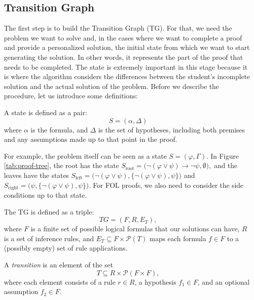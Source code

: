 \documentclass[runningheads]{llncs}
\begin{document}
\subsection{Transition Graph}
The first step is to build the Transition Graph (TG). For that, we need the problem we want to solve and, in the cases where we want to complete a proof and provide a personalized solution, the initial state from which we want to start generating the solution. In other words, it represents the part of the proof that needs to be completed. The state is extremely important in this stage because it is where the algorithm considers the differences between the student's incomplete solution and the actual solution of the problem. Before we describe the procedure, let us introduce some definitions:

\begin{definition}[State]
A state is defined as a pair:
\[
S = (\alpha, \Delta)
\]
where \(\alpha\) is the formula, and \(\Delta\) is the set of hypotheses, including both premises and any assumptions made up to that point in the proof.
\end{definition}

For example, the problem itself can be seen as a state \(S = (\varphi, \Gamma)\). In Figure \ref{tab:proof-tree}, the root has the state \(S_{\text{root}} = \big(\neg (\varphi \lor \psi) \to \neg \psi, \emptyset \big),\) and the leaves have the states 
\( S_{\text{left}} = \big(\neg (\varphi \lor \psi), \{\neg (\varphi \lor \psi), \psi\}\big)\) and \(S_{\text{right}} = \big(\psi, \{\neg (\varphi \lor \psi), \psi\}\big)\). For FOL proofs, we also need to consider the side conditions up to that state.

\begin{definition}
The TG is defined as a triple:
\[
TG = (F, R, E_T),
\]
where \( F \) is a finite set of possible logical formulas that our solutions can have, \( R \) is a set of inference rules, and \(E_T \subseteq F \times \mathcal{P}(T)\) maps each formula \( f \in F \) to a (possibly empty) set of rule applications.
\end{definition}

\begin{definition}
A \emph{transition} is an element of the set
\[
T \subseteq R \times \mathcal{P}(F \times F),
\]
where each element consists of a rule \( r \in R \), a hypothesis \( f_1 \in F \), and an optional assumption \( f_2 \in F \).
\end{definition}
\end{document}
